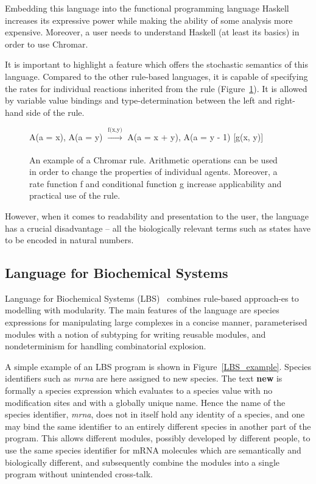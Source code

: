 \documentclass[11pt,a4paper]{report}
\begin{document}
Embedding this language into the functional programming language Haskell increases its expressive power while making the ability of some analysis more expensive. Moreover, a user needs to understand Haskell (at least its basics) in order to use Chromar.

It is important to highlight a feature which offers the stochastic semantics of this language. Compared to the other rule-based languages, it is capable of specifying the rates for individual reactions inherited from the rule (Figure~\ref{chromar_rule}). It is allowed by variable value bindings and type-determination between the left and right-hand side of the rule.

\begin{figure}[!h]
\begin{center}
A(a = x), A(a = y) $\xrightarrow[]{\text{f(x,y)}}$ A(a = x + y), A(a = y - 1) [g(x, y)]
\end{center}
\caption{An example of a Chromar rule. Arithmetic operations can be used in order to change the properties of individual agents. Moreover, a rate function f and conditional function g increase applicability and practical use of the rule.}\label{chromar-rule}\label{chromar_rule}
\end{figure}

However, when it comes to readability and presentation to the user, the language has a crucial disadvantage -- all the biologically relevant terms such as states have to be encoded in natural numbers.

\subsection{Language for Biochemical Systems}

Language for Biochemical Systems (LBS)~\cite{Pedersen} combines rule-based approach-es to modelling with modularity. The main features of the language are species expressions for manipulating large complexes in a concise manner, parameterised modules with a notion of subtyping for writing reusable modules, and nondeterminism for handling combinatorial explosion.

A simple example of an LBS program is shown in Figure~\ref{LBS_example}. Species identifiers such as \emph{mrna} are here assigned to new species. The text \textbf{new{}} is formally a species expression which evaluates to a species value with no modification sites and with a globally unique name. Hence the name of the species identifier, \emph{mrna}, does not in itself hold any identity of a species, and one may bind the same identifier to an entirely different species in another part of the program. This allows different modules, possibly developed by different people, to use the same species identifier for mRNA molecules which are semantically and biologically different, and subsequently combine the modules into a single program without unintended cross-talk.
\end{document}
